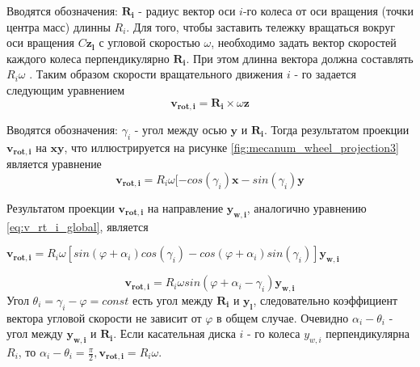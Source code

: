 \documentclass[oneside,final,14pt]{extreport}
\newcommand{\bs}{\boldsymbol}
\begin{document}
\begin{figure}[H]
\end{figure} 

 Вводятся обозначения: $\bs{R_{i}}$ - радиус вектор оси $i$-го колеса от оси вращения  (точки центра масс) длинны $R_{i}$. Для того, чтобы заставить тележку вращаться вокруг оси вращения $C\bs{z_{l}}$ с угловой скоростью $\omega$, необходимо задать вектор скоростей каждого колеса перпендикулярно $\bs{R_{i}}$. При этом длинна вектора должна составлять $R_{i}\omega$ \cite{Saveliev}.
Таким образом скорости вращательного движения $i$ - го задается следующим уравнением
\begin{equation}
\bs{v_{rot,i}}
=
\bs{R_{i}}
\times
\omega
\bs{z}
\end{equation}

\begin{figure}[H]
\end{figure}

 Вводятся обозначения: $\gamma_{i}$ - угол между осью $\bs{y}$ и  $\bs{R_{i}}$. Тогда результатом проекции $\bs{v_{rot,i}}$   на  $\bs{xy}$, что иллюстрируется на рисунке \ref{fig:mecanum_wheel_projection3} является уравнение 
\begin{equation}
\bs{v_{rot,i}}
=
R_{i}
\omega
[
-cos(\gamma_{i})
\bs{x}
-
sin(\gamma_{i})
\bs{y}
\end{equation}

Результатом проекции $\bs{v_{rot,i}}$ на направление $\bs{y_{w,i}}$, аналогично уравнению \ref{eq:v_rt_i_global}, является
\begin{center}
$
\bs{v_{rot,i}}
=
R_{i}
\omega
[
sin(\varphi + \alpha_{i})
cos(\gamma_{i})
-
cos(\varphi+\alpha_{i})
sin(\gamma_{i})
]
\bs{y_{w,i}}
$
\end{center}
\begin{equation}
\bs{v_{rot,i}}
=
R_{i}
\omega
sin(\varphi+\alpha_{i}-\gamma_{i})
\bs{y_{w,i}}
\end{equation}
Угол $\theta_{i} = \gamma_{i} -\varphi = const$ есть угол между $\bs{R_{i}}$ и $\bs{y_{l}}$, следовательно коэффициент вектора угловой скорости не зависит от $\varphi$ в общем случае. Очевидно $\alpha_{i} - \theta_{i}$ - угол между $\bs{y_{w,i}}$ и $\bs{R_{i}}$. Если касательная диска $i$ - го колеса $y_{w,i}$  перпендикулярна $R_{i}$, то $\alpha_{i} - \theta_{i} = \frac{\pi}{2}, \bs{v_{rot,i}} = R_{i}\omega$. 
\iffalse
 Кроме того, справедливо 
\begin{gather}
\dot{x}
=
v_{x}\bs{x}
\\
\dot{y}
=
v_{y}\bs{y}
\\
\dot{\varphi}
=
\omega\bs{z}
\end{gather}
Где  $v_{x}$, $v_{x}$, $\omega$ - величина скорости по направлению $\bs{x}$ и $\bs{y}$ соответственно, $\omega$ - величина угловой скорости.
\fi 
\end{document}
